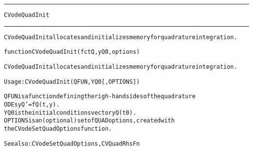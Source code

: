 \begin{samepage}
\hrule
\begin{center}
{\large \verb!CVodeQuadInit!}
\label{p:CVodeQuadInit}
\end{center}
\hrule\vspace{0.1in}



\begin{alltt}
CVodeQuadInit allocates and initializes memory for quadrature integration.
\end{alltt}

\end{samepage}



\begin{samepage}


\begin{alltt}
function CVodeQuadInit(fctQ, yQ0, options) 
\end{alltt}

\end{samepage}



\begin{alltt}
CVodeQuadInit allocates and initializes memory for quadrature integration.

   Usage: CVodeQuadInit ( QFUN, YQ0 [, OPTIONS ] ) 

   QFUN     is a function defining the righ-hand sides of the quadrature
            ODEs yQ' = fQ(t,y).
   YQ0      is the initial conditions vector yQ(t0).
   OPTIONS  is an (optional) set of QUAD options, created with
            the CVodeSetQuadOptions function. 

   See also: CVodeSetQuadOptions, CVQuadRhsFn
\end{alltt}






\vspace{0.1in}